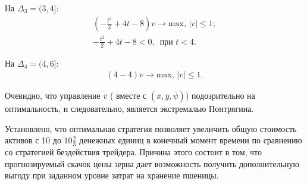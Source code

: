 На $\Delta_3 = (3, 4]$: 
\begin{gather*}
    (-\frac{t^2}{2} + 4t - 8) v \to \mathrm{max}, \, |v| \le 1;\\
   - \frac{t^2}{2}+4t - 8 < 0, \, \textrm{ при $t<4$}.
\end{gather*}

На $\Delta_4 = (4, 6]$: 
\begin{gather*}
    (4- 4) v \to \mathrm{max}, \,
    |v| \le 1.
\end{gather*}

Очевидно, что управление $\overline{v}$  ( вместе с $(\overline{x}, \overline{y}, \overline{\psi})$) подозрительно на оптимальность, и следовательно, является экстремалью Понтрягина.

Установлено, что оптимальная стратегия позволяет увеличить общую стоимость активов с 10 до $10\frac{2}{3}$ денежных единиц в конечный момент времени по сравнению со стратегией бездействия трейдера. Причина этого состоит в том, что прогнозируемый скачок цены зерна дает возможность получить дополнительную выгоду при заданном уровне затрат на хранение пшеницы.
